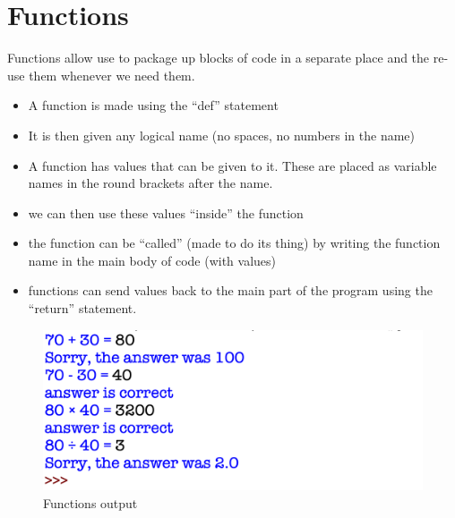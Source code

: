\documentclass[a4paper,12pt]{article}
\begin{document}
\section{Functions}
Functions allow use to package up blocks of code in a separate place and the re-use them whenever we need them.\\
\begin{itemize}
	\item A function is made using the ``def'' statement
	\item It is then given any logical name (no spaces, no numbers in the name)
	\item A function has values that can be given to it. These are placed as variable names in the round brackets after the name.
	\item we can then use these values ``inside'' the function
	\item the function can be ``called'' (made to do its thing) by writing the function name in the main body of code (with values)
	\item functions can send values back to the main part of the program using the ``return'' statement.
\end{itemize}

\begin{figure} [!h]
	\centering
	\includegraphics[width=15cm]{screen_shots/maths_functions_cap.png}
	\caption*{Functions output}
\end{figure}
\newpage
\end{document}
